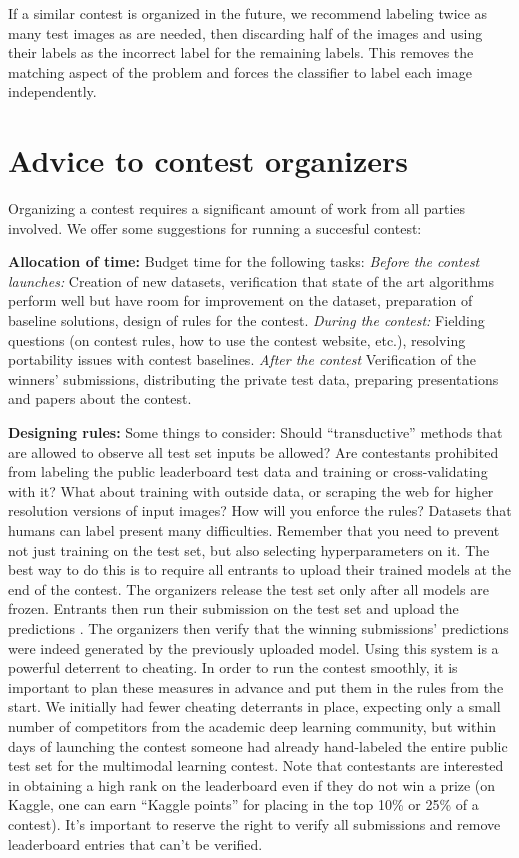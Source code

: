 \documentclass{llncs}
\begin{document}
If a similar contest is organized in the future, we recommend labeling twice as many test images as
are needed, then discarding half of the images and using their labels as the incorrect label for the
remaining labels. This removes the matching aspect of the problem and forces the classifier to label
each image independently.


\section{Advice to contest organizers}

Organizing a contest requires a significant amount of work from all parties involved.
We offer some suggestions for running a succesful contest:

{\bf Allocation of time:} Budget time for the following tasks: {\em Before the contest launches:} 
Creation of new datasets, verification that state of the art algorithms perform well but have room
for improvement on the dataset, preparation of baseline solutions, design of rules for the contest.
{\em During the contest: } Fielding questions (on contest rules, how to use the contest website, etc.),
resolving portability issues with contest baselines. {\em After the contest} Verification of the winners'
submissions, distributing the private test data, preparing presentations and papers about the contest.

{\bf Designing rules:} Some things to consider:
Should ``transductive'' methods that are allowed to observe all test set inputs be allowed? Are contestants prohibited from
labeling the public leaderboard test data and training or cross-validating with it? What about training with outside data, or scraping the web for higher resolution versions of input images? How will you enforce the rules?
Datasets that humans can label present many difficulties. Remember that you need to prevent not just training on the test set, but also selecting hyperparameters on it.
The best way to do this is to require all entrants to upload their trained models at the end of the contest. The organizers
release the test set only after all models are frozen. Entrants then run their submission on the test set and upload the predictions
. The organizers then verify that the winning submissions' predictions were indeed generated by the previously uploaded model.
Using this system is a powerful deterrent to cheating. In order to run the contest smoothly, it is important to plan these
measures in advance and put them in the rules from the start. We initially had fewer cheating deterrants in place, expecting
only a small number of competitors from the academic deep learning community, but within days of launching the contest someone
had already hand-labeled the entire public test set for the multimodal learning contest. Note that contestants are interested in obtaining a high
rank on the leaderboard even if they do not win a prize (on Kaggle, one can earn ``Kaggle points'' for placing in the top 10\% or 25\% of a contest).
It's important to reserve the right to verify all submissions and remove leaderboard entries that can't be verified.
\end{document}

